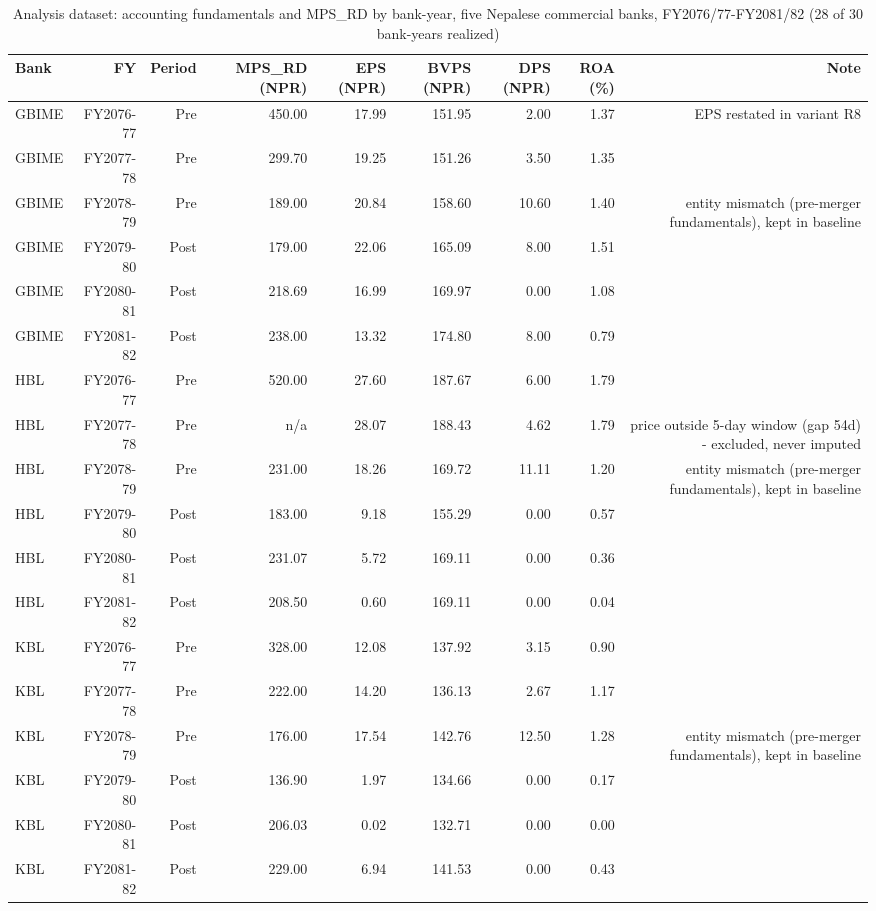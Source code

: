 \begin{table}[htbp]
\centering
\caption{Analysis dataset: accounting fundamentals and MPS\_RD by bank-year, five Nepalese commercial banks, FY2076/77-FY2081/82 (28 of 30 bank-years realized)}
\label{tab:a6_analysis_dataset}
\begin{tabular}{lrrrrrrrr}
\toprule
Bank & FY & Period & MPS\_RD (NPR) & EPS (NPR) & BVPS (NPR) & DPS (NPR) & ROA (\%) & Note \\
\midrule
GBIME & FY2076-77 & Pre & 450.00 & 17.99 & 151.95 & 2.00 & 1.37 & EPS restated in variant R8 \\
GBIME & FY2077-78 & Pre & 299.70 & 19.25 & 151.26 & 3.50 & 1.35 &  \\
GBIME & FY2078-79 & Pre & 189.00 & 20.84 & 158.60 & 10.60 & 1.40 & entity mismatch (pre-merger fundamentals), kept in baseline \\
GBIME & FY2079-80 & Post & 179.00 & 22.06 & 165.09 & 8.00 & 1.51 &  \\
GBIME & FY2080-81 & Post & 218.69 & 16.99 & 169.97 & 0.00 & 1.08 &  \\
GBIME & FY2081-82 & Post & 238.00 & 13.32 & 174.80 & 8.00 & 0.79 &  \\
HBL & FY2076-77 & Pre & 520.00 & 27.60 & 187.67 & 6.00 & 1.79 &  \\
HBL & FY2077-78 & Pre & n/a & 28.07 & 188.43 & 4.62 & 1.79 & price outside 5-day window (gap 54d) - excluded, never imputed \\
HBL & FY2078-79 & Pre & 231.00 & 18.26 & 169.72 & 11.11 & 1.20 & entity mismatch (pre-merger fundamentals), kept in baseline \\
HBL & FY2079-80 & Post & 183.00 & 9.18 & 155.29 & 0.00 & 0.57 &  \\
HBL & FY2080-81 & Post & 231.07 & 5.72 & 169.11 & 0.00 & 0.36 &  \\
HBL & FY2081-82 & Post & 208.50 & 0.60 & 169.11 & 0.00 & 0.04 &  \\
KBL & FY2076-77 & Pre & 328.00 & 12.08 & 137.92 & 3.15 & 0.90 &  \\
KBL & FY2077-78 & Pre & 222.00 & 14.20 & 136.13 & 2.67 & 1.17 &  \\
KBL & FY2078-79 & Pre & 176.00 & 17.54 & 142.76 & 12.50 & 1.28 & entity mismatch (pre-merger fundamentals), kept in baseline \\
KBL & FY2079-80 & Post & 136.90 & 1.97 & 134.66 & 0.00 & 0.17 &  \\
KBL & FY2080-81 & Post & 206.03 & 0.02 & 132.71 & 0.00 & 0.00 &  \\
KBL & FY2081-82 & Post & 229.00 & 6.94 & 141.53 & 0.00 & 0.43 &  \\

\end{tabular}
\end{table}
